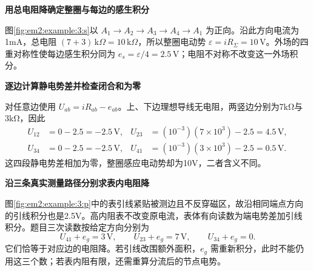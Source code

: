 \begin{solution}\textbf{用总电阻降确定整圈与每边的感生积分}\par\nobreak
图\ref{fig:em2:example:3:s}以 $A_1\to A_2\to A_3\to A_4\to A_1$ 为正向。沿此方向电流为1mA，总电阻 $(7+3)\,\mathrm{k}\Omega=10\,\mathrm{k}\Omega$，所以整圈电动势 $\varepsilon=iR_\Sigma=10\,\mathrm V$。外场的四重对称性使每边感生积分同为 $e_s=\varepsilon/4=2.5\,\mathrm V$；电阻不对称不改变这一外场积分。



\par\medskip{}\noindent\textbf{逐边计算静电势差并检查闭合和为零}\par\nobreak
对任意边使用 $U_{ab}=iR_{ab}-e_{ab}$。上、下边理想导线无电阻，两竖边分别为7kΩ与3kΩ，因此
\begin{align*}U_{12}&=0-2.5=-2.5\,\mathrm V,&U_{23}&=(10^{-3})(7\times10^3)-2.5=4.5\,\mathrm V,\\U_{34}&=0-2.5=-2.5\,\mathrm V,&U_{41}&=(10^{-3})(3\times10^3)-2.5=0.5\,\mathrm V.\end{align*}
这四段静电势差相加为零，整圈感应电动势却为10V，二者含义不同。



\par\medskip{}\noindent\textbf{沿三条真实测量路径分别求表内电阻降}\par\nobreak
图\ref{fig:em2:example:3:p}中的表引线紧贴被测边且不反穿磁区，故沿相同端点方向的引线积分也是2.5V。高内阻表不改变原电流，表体有向读数为端电势差加引线积分。题目三次读数按给定方向分别为
\[U_{41}+e_g=3\,\mathrm V,\qquad U_{23}+e_g=7\,\mathrm V,\qquad U_{34}+e_g=0.\]
它们恰等于对应边的电阻降。若引线改围额外面积，$e_g$ 需重新积分，此时不能仍用这三个数；若表内阻有限，还需重算分流后的节点电势。\end{solution}
